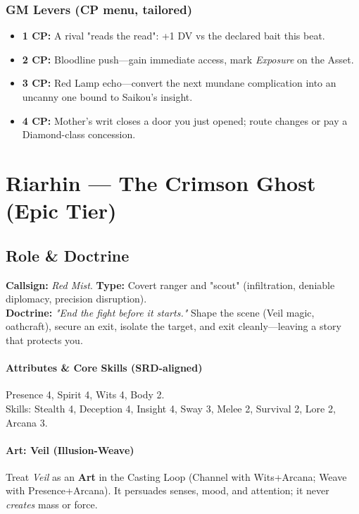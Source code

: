 \subsubsection{GM Levers (CP menu, tailored)}
\begin{itemize}
  \item \textbf{1 CP:} A rival "reads the read": +1 DV vs the declared bait this beat.
  \item \textbf{2 CP:} Bloodline push—gain immediate access, mark \emph{Exposure} on the Asset.
  \item \textbf{3 CP:} Red Lamp echo—convert the next mundane complication into an uncanny one bound to Saikou's insight.
  \item \textbf{4 CP:} Mother's writ closes a door you just opened; route changes or pay a Diamond-class concession.
\end{itemize}

\section{Riarhin — The Crimson Ghost (Epic Tier)}

\subsection{Role \& Doctrine}
\textbf{Callsign:} \emph{Red Mist}. \quad
\textbf{Type:} Covert ranger and "scout" (infiltration, deniable diplomacy, precision disruption). \\
\textbf{Doctrine:} \emph{"End the fight before it starts."} Shape the scene (Veil magic, oathcraft), secure  an exit, isolate the target, and exit cleanly—leaving a story that protects you.

\paragraph{Attributes \& Core Skills (SRD-aligned)}
Presence 4, Spirit 4, Wits 4, Body 2. \\
Skills: Stealth 4, Deception 4, Insight 4, Sway 3, Melee 2, Survival 2, Lore 2, Arcana 3.

\paragraph{Art: Veil (Illusion-Weave)}
Treat \emph{Veil} as an \textbf{Art} in the Casting Loop (Channel with Wits+Arcana; Weave with Presence+Arcana). It persuades senses, mood, and attention; it never \emph{creates} mass or force.

